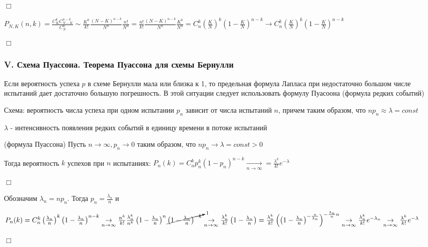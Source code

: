 \documentclass[12pt]{article}
\begin{document}
    \begin{MyProof}
        $\Box$

        $P_{N,K} (n, k) = \frac{C^k_K C_{N - K}^{n - k}}{C^n_N} \sim \frac{K^k}{k!} \frac{(N - K)^{n - k}}{N^n} \frac{n!}{N^n} =
        \frac{n!}{k!} \frac{(N - K)^{n - k}}{N^n} \frac{K^k}{N^n} = C^k_n \left(\frac{K}{N}\right)^k \left(1 - \frac{K}{N}\right)^{n - k} \to C^k_n \left(\frac{K}{N}\right)^k \left(1 - \frac{K}{N}\right)^{n - k} $

        $\Box$
    \end{MyProof}

    \subsubsection{V. Схема Пуассона. Теорема Пуассона для схемы Бернулли}

    \Nota Если вероятность успеха $p$ в схеме Бернулли мала или близка к 1, то предельная формула Лапласа при недостаточно большом
    числе испытаний дает достаточно большую погрешность. В этой ситуации следует использовать формулу Пуасоона (формула редких событий)

    Схема: вероятность числа успеха при одном испытании $p_n$ зависит от числа испытаний $n$, причем таким образом, что $n p_n \approx \lambda = const$

    $\lambda$ - интенсивность появления редких событий в единицу времени в потоке испытаний

    \begin{MyTheorem}
         (формула Пуассона) Пусть $n \to \infty, p_n \to 0$ таким образом, что $n p_n \to \lambda = const > 0$

        Тогда вероятность $k$ успехов при $n$ испытаниях: $P_n(k) = C^k_n p_n^k (1 - p_n)^{n - k} \underset{n \to \infty}{\rightarrow} = \frac{\lambda^k}{k!} e^{-\lambda}$
    \end{MyTheorem}

    \begin{MyProof}
        $\Box$

        Обозначим $\lambda_n = n p_n$. Тогда $p_n = \frac{\lambda_n}{n}$ и

        $P_n(k) = C^k_n \left(\frac{\lambda_n}{n}\right)^k \left(1 - \frac{\lambda_n}{n}\right)^{n - k} \underset{n \to \infty}{\rightarrow} \frac{n^k}{k!} \frac{\lambda^k_n}{n^k} \left(1 - \frac{\lambda_n}{n}\right)^n \cancelto{1}{\left(1 - \frac{\lambda_n}{n}\right)^{-k}}
        \underset{n \to \infty}{\rightarrow} \frac{\lambda_n^k}{k!} \left(1 - \frac{\lambda_n}{n}\right) = \frac{\lambda_n^k}{k!} \left(\left(1 - \frac{\lambda_n}{n}\right)^{-\frac{n}{\lambda_n}}\right)^{-\frac{\lambda_n}{n}n} \underset{n \to \infty}{\rightarrow} \frac{\lambda_n^k}{k!} e^{-\lambda_n} \underset{n \to \infty}{\rightarrow} \frac{\lambda^k}{k!} e^{-\lambda}$

        $\Box$
    \end{MyProof}
\end{document}
